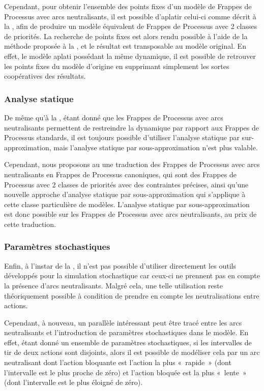 \myskip

Cependant, pour obtenir l'ensemble des points fixes d'un modèle de Frappes de Processus
avec arcs neutralisants, il est possible d'aplatir celui-ci
comme décrit à la ,
afin de produire un modèle équivalent de Frappes de Processus avec 2 classes de priorités.
La recherche de points fixes est alors rendu possible à l'aide de la méthode
proposée à la ,
et le résultat est transposable au modèle original.
En effet, le modèle aplati possédant la même dynamique,
il est possible de retrouver les points fixes du modèle d'origine
en supprimant simplement les sortes coopératives des résultats.

\subsubsection{Analyse statique}

De même qu'à la ,
étant donné que les Frappes de Processus avec arcs neutralisants permettent de restreindre
la dynamique par rapport aux Frappes de Processus standards, il est toujours possible
d'utiliser l'analyse statique par sur-approximation,
mais l'analyse statique par sous-approximation n'est plus valable.

Cependant, nous proposons au 
une traduction des Frappes de Processus avec arcs neutralisants en Frappes de Processus canoniques,
qui sont des Frappes de Processus avec 2 classes de priorités avec des contraintes précises,
ainsi qu'une nouvelle approche d'analyse statique par sous-approximation
qui s'applique à cette classe particulière de modèles.
L'analyse statique par sous-approximation est donc possible sur les Frappes de Processus
avec arcs neutralisants, au prix de cette traduction.

\subsubsection{Paramètres stochastiques}

Enfin, à l'instar de la ,
il n'est pas possible d'utiliser directement les outils développés pour la simulation stochastique
car ceux-ci ne prennent pas en compte la présence d'arcs neutralisants.
Malgré cela, une telle utilisation reste théoriquement possible à condition de prendre
en compte les neutralisations entre actions.

Cependant, à nouveau, un parallèle intéressant peut être tracé entre les arcs neutralisants
et l'introduction de paramètres stochastiques dans le modèle.
En effet, étant donné un ensemble de paramètres stochastiques,
si les intervalles de tir de deux actions sont disjoints,
alors il est possible de modéliser cela par un arc neutralisant
dont l'action bloquante est l'action la plus «~rapide~»
(\cad dont l'intervalle est le plus proche de zéro)
et l'action bloquée est la plus «~lente~»
(\cad dont l'intervalle est le plus éloigné de zéro).

